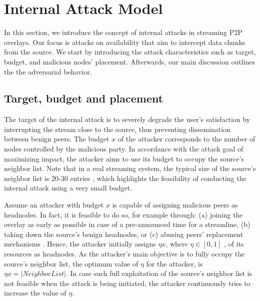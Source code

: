 \section{Internal Attack Model}
\label{sec:Attack}

In this section, we introduce the concept of internal attacks in streaming P2P overlays.
Our focus is attacks on availability that aim to intercept data chunks from the source. 
We start by introducing the attack characteristics such as target, budget, and malicious nodes' placement. 
Afterwards, our main discussion outlines the the \drop adversarial behavior. 

\subsection{Target, budget and placement}


The target of the internal attack is to severely degrade the user's satisfaction by interrupting the stream close to the source, thus preventing dissemination between benign peers.
The budget $x$ of the attacker corresponds to the number of nodes controlled by the malicious party. 
In accordance with the attack goal of maximizing impact, the attacker aims to use its budget to occupy the source's neighbor list. 
Note that in a real streaming system, the typical size of the source's neighbor list is 20-30 entries \cite{neighborlist1,neighborlist2}, which highlights the feasibility of conducting the internal attack using a very small budget.

Assume an attacker with budget $x$ is capable of assigning malicious peers as headnodes.
In fact, it is feasible to do so, for example through: (a) joining the overlay as early as possible in case of a pre-announced time for a streamline, (b) taking down the source's benign headnodes, or (c) abusing peers' replacement mechanisms \cite{nguyen2016swap}.
Hence, the attacker initially assigns $\eta x$, where $\eta\in [0,1]$ , of its resources as headnodes.
As the attacker's main objective is to fully occupy the source's neighbor list, the optimum value of $\eta$ for the attacker, is $\eta x = |NeighborList|$.
In case such full exploitation of the source's neighbor list is not feasible when the attack is being initiated, the attacker continuously tries to increase the value of $\eta$.  

